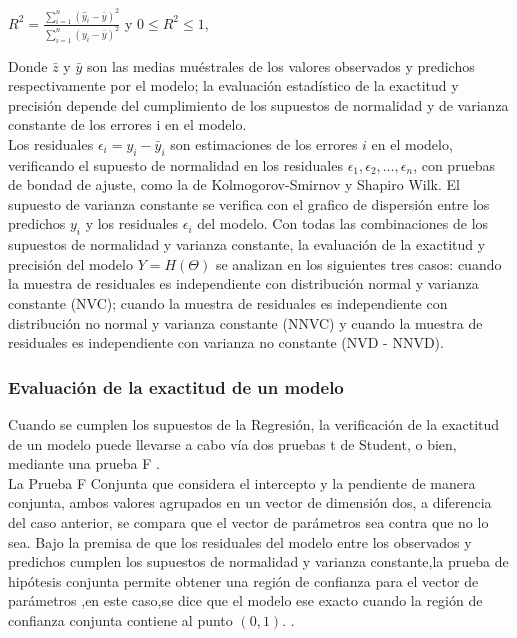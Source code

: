 \begin{center}
{\Large $R^{2} = \frac{ \sum_{i=1}^{n} ( \hat{y}_{i} - \bar{y})^{2}} { \sum_{i=1}^{n} ( y_{i} - \bar{y})^{2}  }$ }  y  $ 0 \leq R^{2} \leq 1$,
\end{center}


Donde $ \bar{z}$ y $ \bar{y}$ son las medias muéstrales de los valores observados y predichos respectivamente por el modelo; la evaluación estadístico de la exactitud y precisión depende del cumplimiento de los supuestos de normalidad y de varianza constante de los errores i en el modelo. \\


Los residuales $\epsilon_{i} = y_{i} - \bar{y}_{i}$ son estimaciones de los errores $i$ en el modelo, verificando el  supuesto de normalidad en los residuales $\epsilon_{1}, \epsilon_{2} , \dots, \epsilon_{n} $, con pruebas de bondad de ajuste, como la de Kolmogorov-Smirnov y Shapiro Wilk. El supuesto de varianza constante se verifica con el grafico de dispersión entre los predichos $y_{i}$ y los residuales $\epsilon_{i}$ del modelo. Con todas las combinaciones de los supuestos de normalidad y varianza constante, la evaluación de la exactitud y precisión del modelo $Y = H(\Theta )$ se analizan en los siguientes tres casos: cuando la muestra de residuales es independiente con distribución normal y varianza constante (NVC); cuando la muestra de residuales es independiente con distribución no normal y varianza constante (NNVC) y cuando la muestra
de residuales es independiente con varianza no constante (NVD - NNVD).

\subsubsection{Evaluación de la exactitud de un modelo}

Cuando se cumplen los supuestos de la Regresión, la verificación de la exactitud de un modelo puede llevarse a cabo vía dos pruebas t de Student, o bien, mediante una prueba F \parencite{balam-2012}.\\

La Prueba F Conjunta que considera el intercepto y la pendiente de manera conjunta, ambos valores agrupados en un vector de dimensión dos, a diferencia del caso anterior, se compara que el vector de parámetros  sea  contra que no lo sea. Bajo la premisa de que los residuales del modelo entre los observados y predichos cumplen los supuestos de normalidad y varianza constante,la prueba de hipótesis conjunta permite obtener una región de confianza para el vector de parámetros ,en este caso,se dice que el modelo ese exacto cuando la región de confianza conjunta contiene al punto $(0,1)$. \parencite{zacarias-2023}.\\

